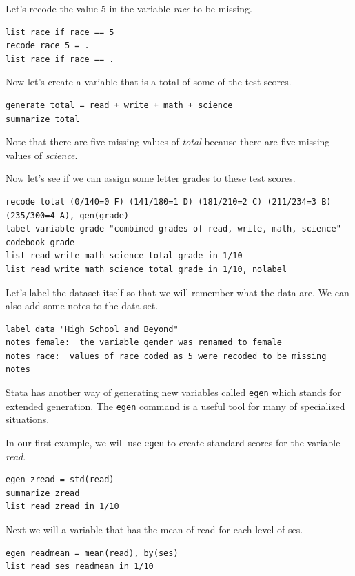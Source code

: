 \documentclass{article}
\begin{document}
Let's recode the value 5 in the variable \textit{race} to be missing.

\begin{lstlisting}
list race if race == 5
recode race 5 = .
list race if race == .
\end{lstlisting}

Now let's create a variable that is a total of some of the test scores.

\begin{lstlisting}
generate total = read + write + math + science
summarize total
\end{lstlisting}

Note that there are five missing values of \textit{total} because there are five missing values of \textit{science}.

Now let's see if we can assign some letter grades to these test scores.

\begin{lstlisting}
recode total (0/140=0 F) (141/180=1 D) (181/210=2 C) (211/234=3 B) (235/300=4 A), gen(grade)
label variable grade "combined grades of read, write, math, science"
codebook grade
list read write math science total grade in 1/10
list read write math science total grade in 1/10, nolabel
\end{lstlisting}

Let's label the dataset itself so that we will remember what the data are. We can also add some notes to the data set.

\begin{lstlisting}
label data "High School and Beyond"
notes female:  the variable gender was renamed to female
notes race:  values of race coded as 5 were recoded to be missing
notes
\end{lstlisting}

Stata has another way of generating new variables called \lstinline{egen} which stands for extended generation.  The \lstinline{egen} command is a useful tool for many of specialized situations.

In our first example, we will use \lstinline{egen} to create standard scores for the variable \textit{read}.

\begin{lstlisting}
egen zread = std(read)
summarize zread
list read zread in 1/10
\end{lstlisting}

Next we will a variable that has the mean of read for each level of ses.

\begin{lstlisting}
egen readmean = mean(read), by(ses)
list read ses readmean in 1/10
\end{lstlisting}
\end{document}
